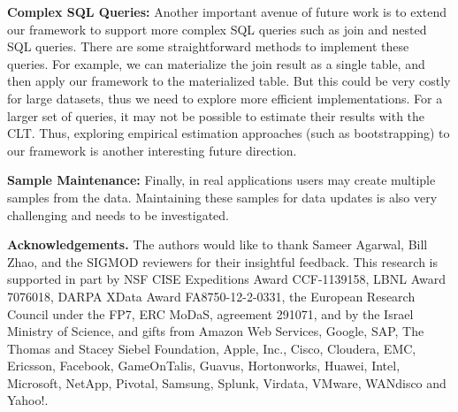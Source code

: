 \vspace{.25em}
{\noindent \bf Complex SQL Queries:} Another important avenue of future work is to extend our framework to support more complex SQL queries such as join and nested SQL queries. There are some straightforward methods to implement these queries. For example, we can materialize the join result as a single table, and then apply our framework to the materialized table. But this could be very costly for large datasets, thus we need to explore more efficient implementations.
For a larger set of queries, it may not be possible to estimate their results with the CLT.
Thus, exploring empirical estimation approaches (such as bootstrapping) to our framework is another interesting future direction.

\vspace{.25em}
{\noindent \bf Sample Maintenance:} Finally, in real applications users may create multiple samples from the data.
Maintaining these samples for data updates is also very challenging and needs to be investigated.


\vspace{1.5em}

\fussy
{\noindent  \bf Acknowledgements.} {\small  The authors would like to thank Sameer Agarwal, Bill Zhao, and the SIGMOD reviewers for their insightful feedback. This research is supported in part by NSF CISE Expeditions Award CCF-1139158, LBNL Award 7076018, DARPA XData Award FA8750-12-2-0331, the European Research Council under the FP7, ERC MoDaS, agreement 291071, and by the Israel Ministry of Science, and gifts from Amazon Web Services, Google, SAP, The Thomas and Stacey Siebel Foundation, Apple, Inc., Cisco, Cloudera, EMC, Ericsson, Facebook, GameOnTalis, Guavus, Hortonworks, Huawei, Intel, Microsoft, NetApp, Pivotal, Samsung, Splunk, Virdata, VMware, WANdisco and Yahoo!.
}
\sloppy



